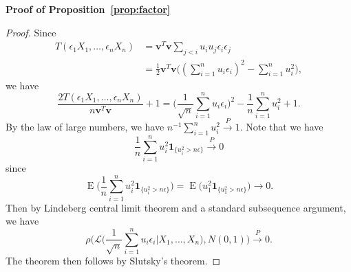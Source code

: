\documentclass[smallcondensed,final,natbib]{svjour3}          %
\DeclareMathOperator{\myE}{E}
\newcommand{\Bv}{\mathbf{v}}
\begin{document}
\textbf{Proof of Proposition~\ref{prop:factor}}
\begin{proof}
    Since
\begin{equation*}
    \begin{aligned}
        T(\epsilon_1 X_1,\ldots,\epsilon_n X_n)&=\Bv^T \Bv\sum_{j<i}  u_i u_j \epsilon_i \epsilon_j\\
        &=\frac{1}{2}\Bv^T \Bv\big( (\sum_{i=1}^n u_i \epsilon_i )^2-\sum_{i=1}^n u_i^2\big),
    \end{aligned}
\end{equation*}
we have
    \begin{equation*}
\frac{2T(\epsilon_1 X_1,\ldots,\epsilon_n X_n)}{n\Bv^T \Bv}+1=
         \big(\frac{1}{\sqrt{n}}\sum_{i=1}^n u_i \epsilon_i \big)^2-\frac{1}{n}\sum_{i=1}^n u_i^2+ 1.
    \end{equation*}
    By the law of large numbers, we have $n^{-1}\sum_{i=1}^n u_i^2\xrightarrow{P} 1$.
    Note that we have
    \begin{equation*}
        \frac{1}{n} \sum_{i=1}^n u_i^2\mathbf{1}_{\{u_i^2>n\epsilon\}}\xrightarrow{P}0
    \end{equation*}
    since
    \begin{equation*}
        \myE\Big(\frac{1}{n} \sum_{i=1}^n u_i^2\mathbf{1}_{\{u_i^2>n\epsilon\}}\Big)
        =
        \myE \big( u_1^2\mathbf{1}_{\{u_1^2>n\epsilon\}}\big)\to 0.
    \end{equation*}
    Then by Lindeberg central limit theorem and a standard subsequence argument, we have
    \begin{equation*}
        \rho\Big(\mathcal{L}\big(\frac{1}{\sqrt{n}}\sum_{i=1}^n u_i \epsilon_i \big|X_1,\ldots,X_n\big),N(0,1)\Big)\xrightarrow{P}0.
    \end{equation*}
The theorem then follows by Slutsky's theorem.

\end{proof}





%
%
\end{document}
